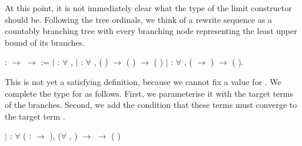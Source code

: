 At this point, it is not immediately clear what the type of the limit
constructor should be. Following the tree ordinals, we think of a rewrite
sequence as a countably branching tree with every branching node representing
the least upper bound of its branches.
\begin{singlespace}
\begin{coqdoccode}
\coqdocnoindent
{}
 :
 \ensuremath{\rightarrow}
 \ensuremath{\rightarrow}
 :=\coqdoceol
\coqdocindent{1.00em}
\ensuremath{|}  :
\ensuremath{\forall} , 
\coqdoceol \coqdocindent{1.00em}
\ensuremath{|}  :
\ensuremath{\forall}   , (
 )
$\rightarrow$
( 
) $\rightarrow$ (
)\coqdoceol \coqdocindent{1.00em}
\ensuremath{|}    :
\ensuremath{\forall}  ,
(
\ensuremath{\rightarrow} 
) $\rightarrow$
(
).\coqdoceol
\end{coqdoccode}
\end{singlespace}
This is not yet a satisfying definition, because we cannot fix a value for
. We complete the type for
 as follows. First, we
parameterise it with the target terms of the branches. Second, we add the
condition that these terms must converge to the target term
.
\begin{singlespace}
\begin{coqdoccode}
\coqdocindent{1.00em}\label{coq:lim}
\ensuremath{|}  :
\ensuremath{\forall}  
( :
\ensuremath{\rightarrow} ),\coqdoceol
\coqdocindent{5.0em}
(\ensuremath{\forall} , 
 ) $\rightarrow$
 
 $\rightarrow$
(
)\coqdoceol
\end{coqdoccode}
\end{singlespace}

